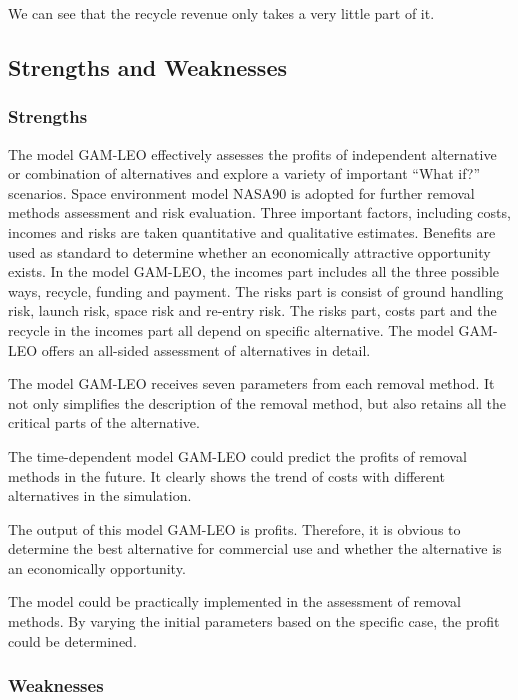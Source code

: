 \documentclass{mcmthesis}
\begin{document}
	We can see that the recycle revenue only takes a very little part of it.

	\subsection{Strengths and Weaknesses}
	
	
		\subsubsection{Strengths}
		
		The model GAM-LEO effectively assesses the profits of independent alternative or combination of alternatives and explore a variety of important “What if?” scenarios. Space environment model NASA90 is adopted for further removal methods assessment and risk evaluation. Three important factors, including costs, incomes and risks are taken quantitative and qualitative estimates. Benefits are used as standard to determine whether an economically attractive opportunity exists. In the model GAM-LEO, the incomes part includes all the three possible ways, recycle, funding and payment. The risks part is consist of ground handling risk, launch risk, space risk and re-entry risk. The risks part, costs part and the recycle in the incomes part all depend on specific alternative. The model GAM-LEO offers an all-sided assessment of alternatives in detail.
		
		The model GAM-LEO receives seven parameters from each removal method. It not only simplifies the description of the removal method, but also retains all the critical parts of the alternative.
		
		The time-dependent model GAM-LEO could predict the profits of removal methods in the future. It clearly shows the trend of costs with different alternatives in the simulation.
		
		The output of this model GAM-LEO is profits. Therefore, it is obvious to determine the best alternative for commercial use and whether the alternative is an economically opportunity.
		
		The model could be practically implemented in the assessment of removal methods. By varying the initial parameters based on the specific case, the profit could be determined.
		
		\subsubsection{Weaknesses}
		
\end{document}
